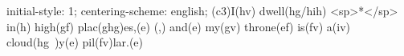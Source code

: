 initial-style: 1;
centering-scheme: english;
(c3)I(hv) dwell(hg/hih) <sp>*</sp> in(h) high(gf) plac(ghg)es,(e) (,) and(e) my(gv) throne(ef) is(fv) a(iv) cloud(hg~)y(e) pil(fv)lar.(e)

